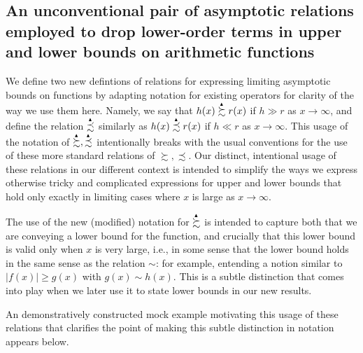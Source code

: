 \documentclass[11pt,reqno,a4letter]{article}
\numberwithin{figure}{section}
\numberwithin{table}{section}
\theoremstyle{plain}
\numberwithin{theorem}{section}
\theoremstyle{definition}
\newcommand{\SuccSim}[0]{\overset{_{\scriptsize{\blacktriangle}}}{\succsim}}
\newcommand{\PrecSim}[0]{\overset{_{\scriptsize{\blacktriangle}}}{\precsim}}
\begin{document}
\subsection{An unconventional pair of asymptotic relations employed to drop 
            lower-order terms in upper and lower bounds on arithmetic functions} 
         
We define two new defintions of relations for expressing limiting asymptotic bounds on functions by 
adapting notation for existing operators for clarity of the way we use them here.       
Namely, we say that $h(x) \SuccSim r(x)$ if $h \gg r$ as $x \rightarrow \infty$, and define 
the relation $\PrecSim$ similarly as 
$h(x) \PrecSim r(x)$ if $h \ll r$ as $x \rightarrow \infty$. 
This usage of the notation of $\SuccSim,\PrecSim$ intentionally breaks with the usual conventions for the use of 
these more standard relations of $\succsim,\precsim$. 
Our distinct, intentional usage of these relations in our different context is intended to 
simplify the ways we express otherwise tricky and complicated expressions for upper and lower bounds that hold only 
exactly in limiting cases where $x$ is large as $x \rightarrow \infty$. 

The use of the new (modified) notation for $\SuccSim$ is intended to capture both that we are conveying a lower bound for the 
function, and crucially that this lower bound is valid only when $x$ is very large, i.e., in some sense that the lower bound 
holds in the same sense as the relation $\sim$: for example, entending a notion similar to 
$|f(x)| \geq g(x)$ with $g(x) \sim h(x)$. 
This is a subtle distinction that comes into play when we later use it to state lower bounds in our new results. 

An demonstratively constructed mock example motivating this usage of these 
relations that clarifies the point of making this subtle distinction in notation appears below. 
\end{document}
